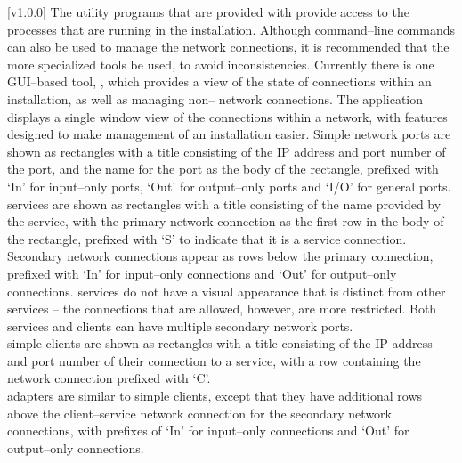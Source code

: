 [v1.0.0]
The utility programs that are provided with \mplusm{} provide access to the processes that
are running in the \mplusm{} installation.
Although command--line \yarp{} commands can also be used to manage the network
connections, it is recommended that the more specialized \mplusm{} tools be used, to avoid
inconsistencies.
Currently there is one GUI--based tool, ,
which provides a view of the state of connections within an \mplusm{} installation, as
well as managing non--\mplusm{} \yarp{} network connections.
The  application displays a single window
view of the connections within a \yarp{} network, with features designed to make
management of an \mplusm{} installation easier.
Simple \yarp{} network ports are shown as rectangles with a title consisting of the IP
address and port number of the port, and the \yarp{} name for the port as the body of the
rectangle, prefixed with `In' for input--only ports, `Out' for output--only ports and
`I/O' for general ports.\\

\mplusm{} services are shown as rectangles with a title consisting of the name provided by
the service, with the primary \yarp{} network connection as the first row in the body of
the rectangle, prefixed with `S' to indicate that it is a service connection.
Secondary \yarp{} network connections appear as rows below the primary connection,
prefixed with `In' for input--only connections and `Out' for output--only connections.
\mplusm{}  services do not have a visual appearance that is distinct from
other \mplusm{} services -- the connections that are allowed, however, are more
restricted.
Both \mplusm{} services and clients can have multiple secondary \yarp{} network ports.\\

\mplusm{} simple clients are shown as rectangles with a title consisting of the IP address
and port number of their connection to a service, with a row containing the \yarp{}
network connection prefixed with `C'.\\

\mplusm{} adapters are similar to \mplusm{} simple clients, except that they have
additional rows above the client--service \yarp{} network connection for the secondary
\yarp{} network connections, with prefixes of `In' for input--only connections and `Out'
for output--only connections.\\

